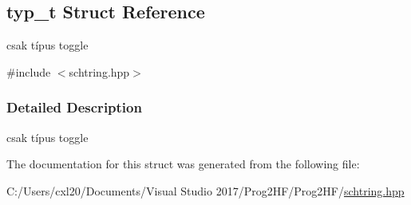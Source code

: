 \subsection{typ\+\_\+t Struct Reference}
\label{structtyp__t}


csak típus toggle  




{\ttfamily \#include $<$schtring.\+hpp$>$}



\subsubsection{Detailed Description}
csak típus toggle 

The documentation for this struct was generated from the following file\+:\begin{DoxyCompactItemize}
\item 
C\+:/\+Users/cxl20/\+Documents/\+Visual Studio 2017/\+Prog2\+H\+F/\+Prog2\+H\+F/\mbox{\hyperlink{schtring_8hpp}{schtring.\+hpp}}\end{DoxyCompactItemize}
